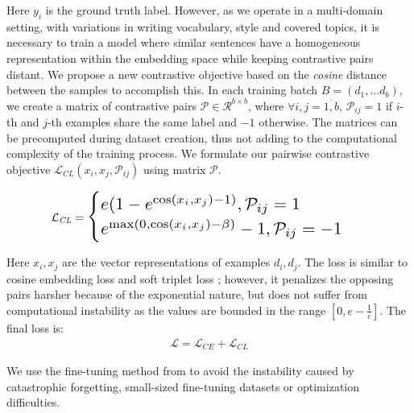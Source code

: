 \documentclass[11pt]{article}
\begin{document}
Here $y_i$ is the ground truth label. However, as we operate in a multi-domain setting, with variations in writing vocabulary, style and covered topics, it is necessary to train a model where similar sentences have a homogeneous representation within the embedding space while keeping contrastive pairs distant. We propose a new contrastive objective based on the \textit{cosine} distance between the samples to accomplish this. In each training batch $B=(d_1, \dots d_b)$, we create a matrix of contrastive pairs $\mathcal{P} \in \mathcal{R}^{b \times b}$, where $\forall i,j =\overline{1,b}$, $\mathcal{P}_{ij} =1$ if $i$-th and $j$-th examples share the same label and $-1$ otherwise. The matrices can be precomputed during dataset creation, thus not adding to the computational complexity of the training process. We formulate our pairwise contrastive objective $\mathcal{L}_\textit{CL}(x_i, x_j, \mathcal{P}_{ij})$ using matrix $\mathcal{P}$.

\begin{align}
\mathcal{L}_\textit{CL}=\resizebox{.72\hsize}{!}{$ \begin{cases} e(1- e^{\cos \left(x_i, x_j\right) - 1)}, \mathcal{P}_{ij}=1 \\ e^{\max \left(0, \cos \left(x_i, x_j\right)-\beta\right)}-1, \mathcal{P}_{ij}=-1\end{cases}$
}
\end{align}

Here $x_i,x_j$ are the vector representations of examples $d_i,d_j$. The loss is similar to cosine embedding loss and soft triplet loss
 \citep{barz2020deep,qian2019softtriple}; however, it penalizes the opposing pairs harsher because of the exponential nature, but does not suffer from computational instability as the values are bounded in the range $[0,e - \frac{1}{e}]$. 
 The final loss is:  \begin{align}
     \mathcal{L} = \mathcal{L}_\textit{CE} + \mathcal{L}_\textit{CL}
 \end{align}

We use the fine-tuning method from \citet{mosbach2020stability, liu2019roberta} to avoid the instability caused by catastrophic forgetting, small-sized fine-tuning datasets or optimization difficulties.
\end{document}

